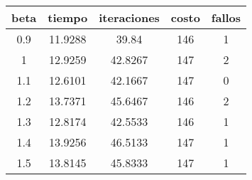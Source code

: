 \begin{table}[h!]
\centering
\begin{tabular}{ccccc}
beta & tiempo & iteraciones & costo & fallos \\ 
\hline 
0.9 & 11.9288 & 39.84 & 146 & 1 \\ 
1 & 12.9259 & 42.8267 & 147 & 2 \\ 
1.1 & 12.6101 & 42.1667 & 147 & 0 \\ 
1.2 & 13.7371 & 45.6467 & 146 & 2 \\ 
1.3 & 12.8174 & 42.5533 & 146 & 1 \\ 
1.4 & 13.9256 & 46.5133 & 147 & 1 \\ 
1.5 & 13.8145 & 45.8333 & 147 & 1 \\ 
\hline 
\end{tabular}
\end{table}